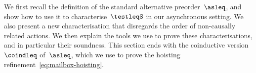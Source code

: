 \label{sec:bhv-preorder}

We first recall the definition of the standard alternative preorder~$\asleq$,
and show how to use it to characterise~$\testleqS$ in our asynchronous setting.
%
We also present a new characterisation that disregards the order of non-causally
related actions.
%
We then explain the tools we use to prove these characterisations, and in
particular their soundness.
%
This section ends with the coinductive version~$\coindleq$ of~$\asleq$,
which we use to prove the hoisting refinement~\eqref{eq:mailbox-hoisting}.






